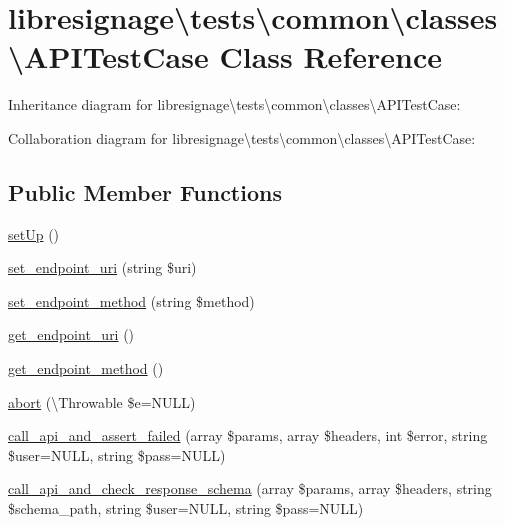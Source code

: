 \hypertarget{classlibresignage_1_1tests_1_1common_1_1classes_1_1APITestCase}{}\section{libresignage\textbackslash{}tests\textbackslash{}common\textbackslash{}classes\textbackslash{}A\+P\+I\+Test\+Case Class Reference}
\label{classlibresignage_1_1tests_1_1common_1_1classes_1_1APITestCase}


Inheritance diagram for libresignage\textbackslash{}tests\textbackslash{}common\textbackslash{}classes\textbackslash{}A\+P\+I\+Test\+Case\+:


Collaboration diagram for libresignage\textbackslash{}tests\textbackslash{}common\textbackslash{}classes\textbackslash{}A\+P\+I\+Test\+Case\+:
\subsection*{Public Member Functions}
\begin{DoxyCompactItemize}
\item 
\hyperlink{classlibresignage_1_1tests_1_1common_1_1classes_1_1APITestCase_af0352ac98904d93cc62354ee86867721}{set\+Up} ()
\item 
\hyperlink{classlibresignage_1_1tests_1_1common_1_1classes_1_1APITestCase_a7ed0c1ee99e4cde07adb80d893031314}{set\+\_\+endpoint\+\_\+uri} (string \$uri)
\item 
\hyperlink{classlibresignage_1_1tests_1_1common_1_1classes_1_1APITestCase_af43c229ebc2996abba09e1624bbb28d3}{set\+\_\+endpoint\+\_\+method} (string \$method)
\item 
\hyperlink{classlibresignage_1_1tests_1_1common_1_1classes_1_1APITestCase_ac395414fca839a70191c8a19164ff002}{get\+\_\+endpoint\+\_\+uri} ()
\item 
\hyperlink{classlibresignage_1_1tests_1_1common_1_1classes_1_1APITestCase_a4b9d5269ebdcf035fb95d59499859d65}{get\+\_\+endpoint\+\_\+method} ()
\item 
\hyperlink{classlibresignage_1_1tests_1_1common_1_1classes_1_1APITestCase_ac1f096741f9e12c57165f63e278b7e66}{abort} (\textbackslash{}Throwable \$e=N\+U\+LL)
\item 
\hyperlink{classlibresignage_1_1tests_1_1common_1_1classes_1_1APITestCase_aec924a9c1d47eae2ed23ed42e057d1b9}{call\+\_\+api\+\_\+and\+\_\+assert\+\_\+failed} (array \$params, array \$headers, int \$error, string \$user=N\+U\+LL, string \$pass=N\+U\+LL)
\item 
\hyperlink{classlibresignage_1_1tests_1_1common_1_1classes_1_1APITestCase_abbe1b96fba72df357f3317f84783317a}{call\+\_\+api\+\_\+and\+\_\+check\+\_\+response\+\_\+schema} (array \$params, array \$headers, string \$schema\+\_\+path, string \$user=N\+U\+LL, string \$pass=N\+U\+LL)
\end{DoxyCompactItemize}
